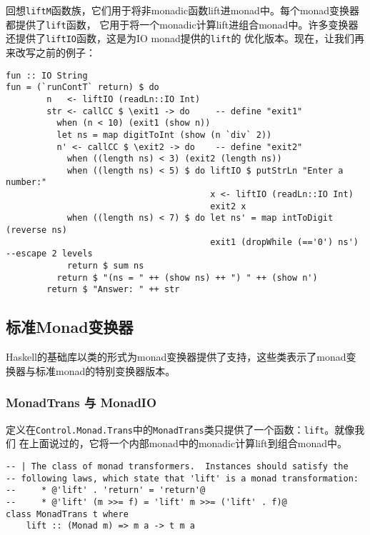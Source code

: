 \indent{}回想\texttt{liftM}函数族，它们用于将非monadic函数lift进monad中。每个monad变换器都提供了\texttt{lift}函数，
它用于将一个monadic计算lift进组合monad中。许多变换器还提供了\texttt{liftIO}函数，这是为IO monad提供的\texttt{lift}的
优化版本。现在，让我们再来改写之前的例子：
\begin{verbatim}
fun :: IO String
fun = (`runContT` return) $ do
        n   <- liftIO (readLn::IO Int)
        str <- callCC $ \exit1 -> do     -- define "exit1"
          when (n < 10) (exit1 (show n))
          let ns = map digitToInt (show (n `div` 2))
          n' <- callCC $ \exit2 -> do    -- define "exit2"
            when ((length ns) < 3) (exit2 (length ns))
            when ((length ns) < 5) $ do liftIO $ putStrLn "Enter a number:"
                                        x <- liftIO (readLn::IO Int)
                                        exit2 x
            when ((length ns) < 7) $ do let ns' = map intToDigit (reverse ns)
                                        exit1 (dropWhile (=='0') ns')  --escape 2 levels
            return $ sum ns
          return $ "(ns = " ++ (show ns) ++ ") " ++ (show n')
        return $ "Answer: " ++ str
\end{verbatim}

\subsection{标准Monad变换器}
\indent{}Haskell的基础库以类的形式为monad变换器提供了支持，这些类表示了monad变换器与标准monad的特别变换器版本。

\subsubsection{MonadTrans 与 MonadIO}
\indent{}定义在\texttt{Control.Monad.Trans}中的\texttt{MonadTrans}类只提供了一个函数：\texttt{lift}。就像我们
在上面说过的，它将一个内部monad中的monadic计算lift到组合monad中。
\begin{verbatim}
-- | The class of monad transformers.  Instances should satisfy the
-- following laws, which state that 'lift' is a monad transformation:
--     * @'lift' . 'return' = 'return'@
--     * @'lift' (m >>= f) = 'lift' m >>= ('lift' . f)@
class MonadTrans t where
    lift :: (Monad m) => m a -> t m a
\end{verbatim}

